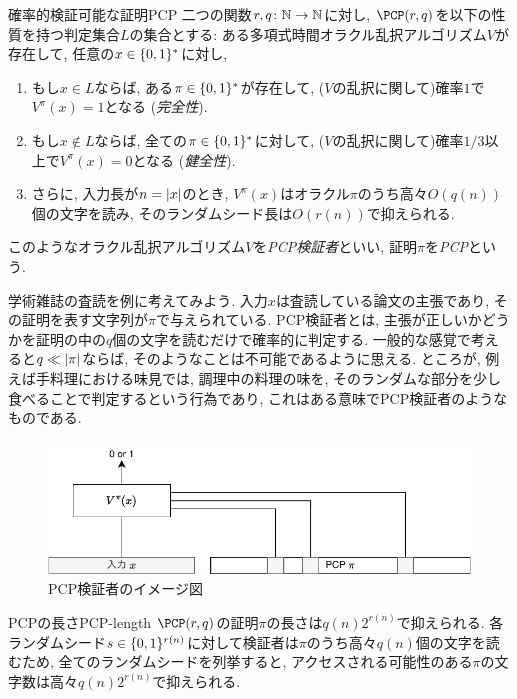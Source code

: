 \begin{definition}{確率的検証可能な証明}{PCP}
  二つの関数$r,q\colon\mathbb{N}\to\mathbb{N}$に対し, $\PCP(r,q)$を以下の性質を持つ判定集合$L$の集合とする: ある多項式時間オラクル乱択アルゴリズム$V$が存在して, 任意の$x\in\{0,1\}^*$に対し,
  \begin{enumerate}
  \item もし$x\in L$ならば, ある$\pi\in\{0,1\}^*$が存在して, ($V$の乱択に関して)確率$1$で$V^\pi(x)=1$となる (\emph{完全性}).
  \item もし$x\notin L$ならば, 全ての$\pi\in\{0,1\}^*$に対して, ($V$の乱択に関して)確率$1/3$以上で$V^\pi(x)=0$となる (\emph{健全性}).
  \item さらに, 入力長が$n=\abs{x}$のとき, $V^\pi(x)$はオラクル$\pi$のうち高々$O(q(n))$個の文字を読み, そのランダムシード長は$O(r(n))$で抑えられる.
  \end{enumerate}
  このようなオラクル乱択アルゴリズム$V$を\emph{PCP検証者}といい, 証明$\pi$を\emph{PCP}という.
\end{definition}

学術雑誌の査読を例に考えてみよう.
入力$x$は査読している論文の主張であり, その証明を表す文字列が$\pi$で与えられている.
PCP検証者とは, 主張が正しいかどうかを証明の中の$q$個の文字を読むだけで確率的に判定する.
一般的な感覚で考えると$q\ll \abs{\pi}$ならば, そのようなことは不可能であるように思える.
ところが, 例えば手料理における味見では, 調理中の料理の味を, そのランダムな部分を少し食べることで判定するという行為であり, これはある意味でPCP検証者のようなものである.

\begin{figure}[htbp]
  \centering
  \includegraphics[width=\textwidth]{images/PCPverifier.pdf}
  \caption{PCP検証者のイメージ図}
  \label{fig:PCPverifier}
\end{figure}

\begin{remark}{PCPの長さ}{PCP-length}
  $\PCP(r,q)$の証明$\pi$の長さは$q(n)2^{r(n)}$で抑えられる.
  各ランダムシード$s \in \{0,1\}^{r(n)}$に対して検証者は$\pi$のうち高々$q(n)$個の文字を読むため, 全てのランダムシードを列挙すると, アクセスされる可能性のある$\pi$の文字数は高々$q(n)2^{r(n)}$で抑えられる.
\end{remark}

